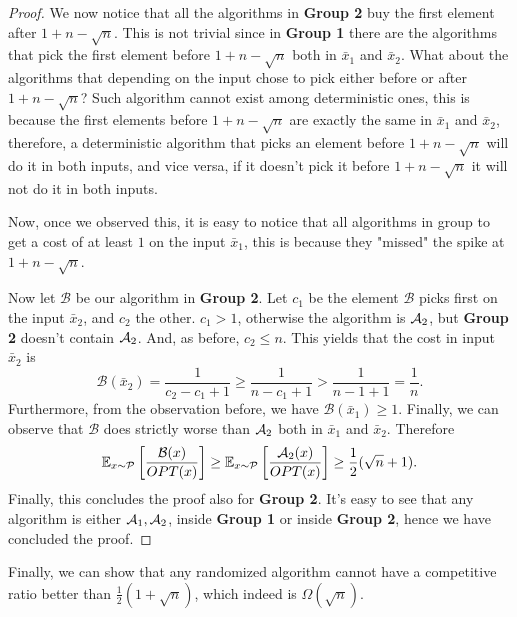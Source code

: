 \documentclass[11pt]{article}
\begin{document}
\begin{enumerate}
\begin{proof}
    We now notice that all the algorithms in \textbf{Group 2} buy the first element after $1 + n - \sqrt{n}$. This is not trivial since in \textbf{Group 1} there are the algorithms that pick the first element before $1 + n - \sqrt{n}$ both in $\bar x_1$ and $\bar x_2$. What about the algorithms that depending on the input chose to pick either before or after $1 + n - \sqrt{n}$? Such algorithm cannot exist among deterministic ones, this is because the first elements before $1 + n - \sqrt{n}$ are exactly the same in $\bar x_1$ and $\bar x_2$, therefore, a deterministic algorithm that picks an element before $1 + n - \sqrt{n}$ will do it in both inputs, and vice versa, if it doesn't pick it before $1 + n - \sqrt{n}$ it will not do it in both inputs.

    Now, once we observed this, it is easy to notice that all algorithms in group to get a cost of at least $1$ on the input $\bar x_1$, this is because they "missed" the spike at $1 + n - \sqrt{n}$. 
    
    Now let $\mathcal {B}$ be our algorithm in \textbf{Group 2}. Let $c_1$ be the element $\mathcal {B}$ picks first on the input $\bar x_2$, and $c_2$ the other. $c_1>1$, otherwise the algorithm is $\mathcal{A}_2$, but \textbf{Group 2} doesn't contain $\mathcal{A}_2$. And, as before, $c_2\leq n$. This yields that the cost in input $\bar x_2$ is 
    \begin{equation*}
        \mathcal {B}(\bar x_2) = \frac{1}{c_2 - c_1 + 1} \geq  \frac{1}{n - c_1 + 1} > \frac{1}{n-1+1} = \frac{1}{n}.
    \end{equation*}
    Furthermore, from the observation before, we have $\mathcal{B}(\bar x_1) \geq 1$. Finally, we can observe that $\mathcal{B}$ does strictly worse than $\mathcal{A}_2$ both in $\bar x_1$ and $\bar x_2$. Therefore
    \begin{equation*}
        \mathbb{E} _{x\sim \mathcal{P}}\left[\frac{\mathcal{B}(x)}{OPT(x)}\right] \geq \mathbb{E} _{x\sim \mathcal{P}}\left[\frac{\mathcal{A}_2(x)}{OPT(x)}\right] \geq \frac{1}{2}(\sqrt{n} + 1).
    \end{equation*}
    Finally, this concludes the proof also for \textbf{Group 2}. It's easy to see that any algorithm is either $\mathcal{A}_1,\mathcal{A}_2$, inside \textbf{Group 1} or inside \textbf{Group 2}, hence we have concluded the proof.
    \end{proof}
    Finally, we can show that any randomized algorithm cannot have a competitive ratio better than $\frac{1}{2}\left(1+\sqrt{n}\right)$, which indeed is $\Omega\left(\sqrt{n}\right)$.


\end{enumerate}
\end{document}

